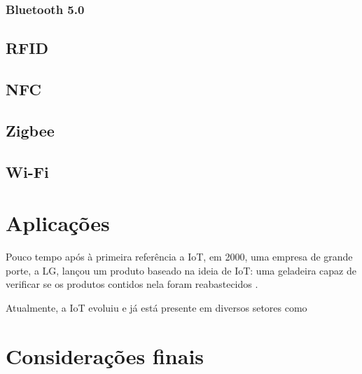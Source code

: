 \documentclass[
	article,			%
	11pt,				%
	oneside,			%
	a4paper,			%
	section=TITLE,		%
	subsection=TITLE,	%
	english,			%
	brazil,				%
	sumario=tradicional
	]{abntex2}
\begin{document}


%

\subsubsection{Bluetooth 5.0}



\subsection{RFID}

\subsection{NFC}

\subsection{Zigbee}

\subsection{Wi-Fi} %

\section{Aplicações}

Pouco tempo após à primeira referência a IoT, em 2000, uma empresa de grande porte, a LG, lançou 
um produto baseado na ideia de IoT: uma geladeira capaz de verificar se os produtos contidos nela 
foram reabastecidos \cite{survey-suresh}.



Atualmente, a IoT evoluiu e já está presente em diversos setores como 





% 

\section*{Considerações finais}







\end{document}
